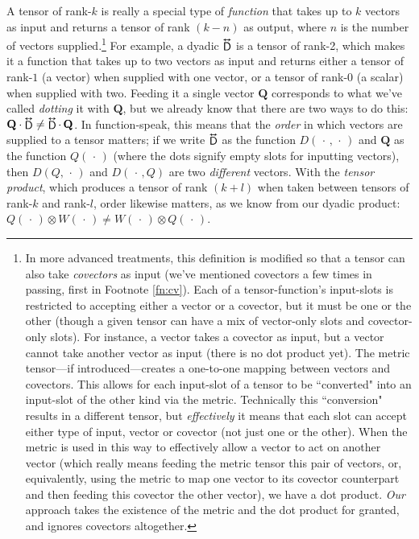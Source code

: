 \documentclass[12pt]{article}
\renewcommand{\vv}[1]{\mathbf{#1}}
\newcommand{\tightoverset}[2]{%
  \mathop{#2}\limits^{\vbox to -.5ex{\kern-0.75ex\hbox{$#1$}\vss}}}
\newcommand{\inlinedy}[1]{\tightoverset{\text{\tiny$\bm\leftrightarrow$}}{#1}}
\begin{document}
A tensor of rank-$k$ is really a special type of \emph{function} that takes up to $k$ vectors as input and returns a tensor of rank $(k - n)$ as output, where $n$ is the number of vectors supplied.\footnote{\label{fn:ten}In more advanced treatments, this definition is modified so that a tensor can also take \emph{covectors} as input (we've mentioned covectors a few times in passing, first in Footnote \ref{fn:cv}). Each of a tensor-function's input-slots is restricted to accepting either a vector or a covector, but it must be one or the other (though a given tensor can have a mix of vector-only slots and covector-only slots). For instance, a vector takes a covector as input, but a vector cannot take another vector as input (there is no dot product yet). The metric tensor---if introduced---creates a one-to-one mapping between vectors and covectors. This allows for each input-slot of a tensor to be ``converted" into an input-slot of the other kind via the metric. Technically this ``conversion" results in a different tensor, but \emph{effectively} it means that each slot can accept either type of input, vector or covector (not just one or the other). When the metric is used in this way to effectively allow a vector to act on another vector (which really means feeding the metric tensor this pair of vectors, or, equivalently, using the metric to map one vector to its covector counterpart and then feeding this covector the other vector), we have a dot product. \emph{Our} approach takes the existence of the metric and the dot product for granted, and ignores covectors altogether.} For example, a dyadic $\inlinedy{\mathsf{D}}$ is a tensor of rank-2, which makes it a function that takes up to two vectors as input and returns either a tensor of rank-$1$ (a vector) when supplied with one vector, or a tensor of rank-$0$ (a scalar) when supplied with two. Feeding it a single vector $\vv Q$ corresponds to what we've called \emph{dotting} it with $\vv Q$, but we already know that there are two ways to do this: $\vv Q \cdot \inlinedy{\mathsf{D}} \neq \inlinedy{\mathsf{D}} \cdot \, \vv Q$. In function-speak, this means that the \emph{order} in which vectors are supplied to a tensor matters; if we write $\inlinedy{\mathsf{D}}$ as the function $D(\, \cdot \, , \, \cdot \,)$ and $\vv Q$ as the function $Q(\, \cdot \, )$ (where the dots signify empty slots for inputting vectors), then $D(Q, \, \cdot \,)$ and $D(\, \cdot \, , Q)$ are two \emph{different} vectors. With the \emph{tensor product}, which produces a tensor of rank $(k + l)$ when taken between tensors of rank-$k$ and rank-$l$, order likewise matters, as we know from our dyadic product: $Q(\, \cdot \, ) \otimes W(\, \cdot \, ) \neq W(\, \cdot \, ) \otimes Q(\, \cdot \, )$.
\end{document}
